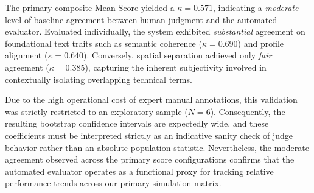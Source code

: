 The primary composite Mean Score yielded a $\kappa = 0.571$, indicating a \textit{moderate} level of baseline agreement between human judgment and the automated evaluator. 
Evaluated individually, the system exhibited \textit{substantial} agreement on foundational text traits such as semantic coherence ($\kappa = 0.690$) and profile alignment ($\kappa = 0.640$).
Conversely, spatial separation achieved only \textit{fair} agreement ($\kappa = 0.385$), capturing the inherent subjectivity involved in contextually isolating overlapping technical terms. 

Due to the high operational cost of expert manual annotations, this validation was strictly restricted to an exploratory sample ($N = 6$). 
Consequently, the resulting bootstrap confidence intervals are expectedly wide, and these coefficients must be interpreted strictly as an indicative sanity check of judge behavior rather than an absolute population statistic.
Nevertheless, the moderate agreement observed across the primary score configurations confirms that the automated evaluator operates as a functional proxy for tracking relative performance trends across our primary simulation matrix.
